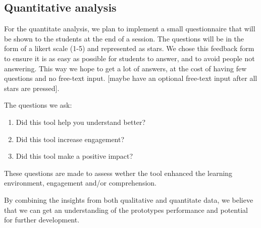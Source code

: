 \subsection{Quantitative analysis}
For the quantitate analysis, we plan to implement a small questionnaire that will be shown to the students at the end of a session. The questions will be in the form of a likert scale (1-5) and represented as stars. We chose this feedback form to ensure it is as easy as possible for students to answer, and to avoid people not answering. This way we hope to get a lot of answers, at the cost of having few questions and no free-text input. [maybe have an optional free-text input after all stars are pressed].

The questions we ask:
\begin{enumerate}
    \item Did this tool help you understand better?
    \item Did this tool increase engagement?
    \item Did this tool make a positive impact?
\end{enumerate}

These questions are made to assess wether the tool enhanced the learning environment, engagement and/or comprehension.

By combining the insights from both qualitative and quantitate data, we believe that we can get an understanding of the prototypes performance and potential for further development.




